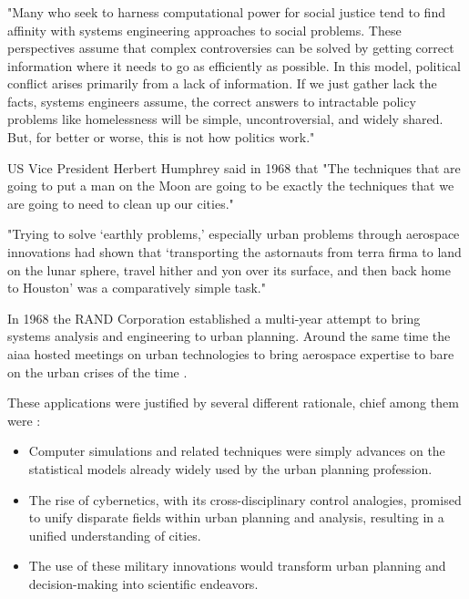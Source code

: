 \subsubsection{} \label{sec:se_critique}


"Many who seek to harness computational power for social justice tend to find affinity with systems engineering approaches to social problems. These perspectives assume that complex controversies can be solved by getting correct information where it needs to go as efficiently as possible. In this model, political conflict arises primarily from a lack of information. If we just gather lack the facts, systems engineers assume, the correct answers to intractable policy problems like homelessness will be simple, uncontroversial, and widely shared. But, for better or worse, this is not how politics work." \cite{eubanksAutomatingInequalityHow2018}

US Vice President Herbert Humphrey said in 1968 that "The techniques that are going to put a man on the Moon are going to be exactly the techniques that we are going to need to clean up our cities." \cite{lightWarfareWelfareDefense2005}

"Trying to solve `earthly problems,' especially urban problems through aerospace innovations had shown that `transporting the astornauts from terra firma to land on the lunar sphere, travel hither and yon over its surface, and then back home to Houston' was a comparatively simple task." \cite{lightWarfareWelfareDefense2005}

In 1968 the RAND Corporation established a multi-year attempt to bring systems analysis and engineering to urban planning. Around the same time the \ac{aiaa} hosted meetings on urban technologies to bring aerospace expertise to bare on the urban crises of the time \cite{lightWarfareWelfareDefense2005}.

These applications were justified by several different rationale, chief among them were \cite{lightWarfareWelfareDefense2005}: 

\begin{itemize} \setlength{\itemsep}{0pt} \setlength{\parskip}{0pt} 
	\item{Computer simulations and related techniques were simply advances on the statistical models already widely used by the urban planning profession.}
	\item{The rise of cybernetics, with its cross-disciplinary control analogies, promised to unify disparate fields within urban planning and analysis, resulting in a unified understanding of cities.}
	\item{The use of these military innovations would transform urban planning and decision-making into scientific endeavors.}
\end{itemize}

